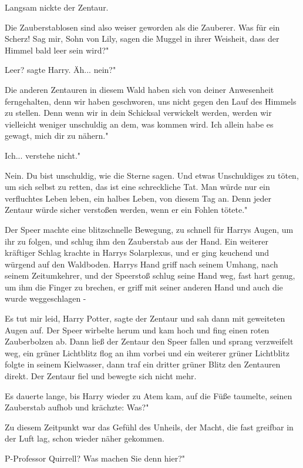 Langsam nickte der Zentaur.

\glqq Die Zauberstablosen sind also weiser geworden als die Zauberer. Was für
ein Scherz! Sag mir, Sohn von Lily, sagen die Muggel in ihrer Weisheit, dass der
Himmel bald leer sein wird?"

\glqq Leer?\grqq{} sagte Harry. \glqq Äh... nein?"

\glqq Die anderen Zentauren in diesem Wald haben sich von deiner Anwesenheit
ferngehalten, denn wir haben geschworen, uns nicht gegen den Lauf des Himmels zu
stellen. Denn wenn wir in dein Schicksal verwickelt werden, werden wir
vielleicht weniger unschuldig an dem, was kommen wird. Ich allein habe es
gewagt, mich dir zu nähern."

\glqq Ich... verstehe nicht."

\glqq Nein. Du bist unschuldig, wie die Sterne sagen. Und etwas Unschuldiges zu
töten, um sich selbst zu retten, das ist eine schreckliche Tat. Man würde nur
ein verfluchtes Leben leben, ein halbes Leben, von diesem Tag an. Denn jeder
Zentaur würde sicher verstoßen werden, wenn er ein Fohlen tötete."

Der Speer machte eine blitzschnelle Bewegung, zu schnell für Harrys Augen, um
ihr zu folgen, und schlug ihm den Zauberstab aus der Hand. Ein weiterer
kräftiger Schlag krachte in Harrys Solarplexus, und er ging keuchend und würgend
auf den Waldboden. Harrys Hand griff nach seinem Umhang, nach seinem
Zeitumkehrer, und der Speerstoß schlug seine Hand weg, fast hart genug, um ihm
die Finger zu brechen, er griff mit seiner anderen Hand und auch die wurde
weggeschlagen -

\glqq Es tut mir leid, Harry Potter\grqq{}, sagte der Zentaur und sah dann mit
geweiteten Augen auf. Der Speer wirbelte herum und kam hoch und fing einen roten
Zauberbolzen ab. Dann ließ der Zentaur den Speer fallen und sprang verzweifelt
weg, ein grüner Lichtblitz flog an ihm vorbei und ein weiterer grüner Lichtblitz
folgte in seinem Kielwasser, dann traf ein dritter grüner Blitz den Zentauren
direkt. Der Zentaur fiel und bewegte sich nicht mehr.

Es dauerte lange, bis Harry wieder zu Atem kam, auf die Füße taumelte, seinen
Zauberstab aufhob und krächzte: \glqq Was?"

Zu diesem Zeitpunkt war das Gefühl des Unheils, der Macht, die fast greifbar in
der Luft lag, schon wieder näher gekommen.

\glqq P-Professor Quirrell? Was machen Sie denn hier?"

